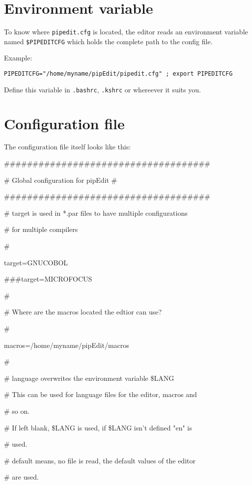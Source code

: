 \documentclass{report}
\begin{document}
\section{Environment variable}

To know where \texttt{pipedit.cfg} is located, the editor reads an environment 
variable named \texttt{\$PIPEDITCFG} which holds the complete path 
to the config file. \\ \break

Example:

\texttt{PIPEDITCFG="/home/myname/pipEdit/pipedit.cfg" ; export PIPEDITCFG} \break

Define this variable in \texttt{.bashrc}, \texttt{.kshrc} 
or whereever it suits you.

\section{Configuration file}

The configuration file itself looks like this:

\#\#\#\#\#\#\#\#\#\#\#\#\#\#\#\#\#\#\#\#\#\#\#\#\#\#\#\#\#\#\#\#\#\#\#\#

\# Global configuration for pipEdit \#

\#\#\#\#\#\#\#\#\#\#\#\#\#\#\#\#\#\#\#\#\#\#\#\#\#\#\#\#\#\#\#\#\#\#\#\#

\# target is used in *.par files to have multiple configurations  

\# for multiple compilers

\#

target=GNUCOBOL

\#\#\#target=MICROFOCUS

\#

\# Where are the macros located the edtior can use?

\#

macros=/home/myname/pipEdit/macros

\#

\# language overwrites the environment variable \$LANG

\# This can be used for language files for the editor, macros and 

\# so on.

\# If left blank, \$LANG is used, if \$LANG isn't defined "en" is

\# used.

\# default means, no file is read, the default values of the editor

\# are used.
\end{document}
